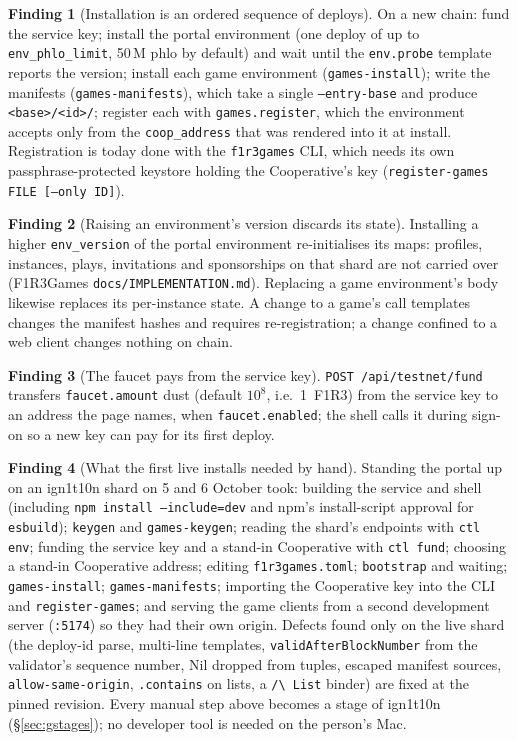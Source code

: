 \documentclass[11pt]{article}
\theoremstyle{definition}
\newtheorem{finding}{Finding}
\theoremstyle{remark}
\newcommand{\code}[1]{\texttt{#1}}
\newcommand{\Hr}{ign1t10n}
\newcommand{\Gm}{F1R3Games}
\begin{document}
\begin{finding}[Installation is an ordered sequence of deploys]\label{f:order}
On a new chain: fund the service key; install the portal environment (one deploy
of up to \code{env\_phlo\_limit}, 50\,M phlo by default) and wait until the
\code{env.probe} template reports the version; install each game environment
(\code{games-install}); write the manifests (\code{games-manifests}), which take a
single \code{--entry-base} and produce \code{<base>/<id>/}; register each with
\code{games.register}, which the environment accepts only from the
\code{coop\_address} that was rendered into it at install. Registration is today done
with the \code{f1r3games} CLI, which needs its own passphrase-protected keystore
holding the Cooperative's key (\code{register-games FILE [--only ID]}).
\end{finding}

\begin{finding}[Raising an environment's version discards its state]\label{f:upgrade}
Installing a higher \code{env\_version} of the portal environment re-initialises its
maps: profiles, instances, plays, invitations and sponsorships on that shard are not
carried over (\Gm{} \code{docs/IMPLEMENTATION.md}). Replacing a game environment's
body likewise replaces its per-instance state. A change to a game's call templates
changes the manifest hashes and requires re-registration; a change confined to a
web client changes nothing on chain.
\end{finding}

\begin{finding}[The faucet pays from the service key]\label{f:faucet}
\code{POST /api/testnet/fund} transfers \code{faucet.amount} dust (default
$10^8$, i.e.\ 1~F1R3) from the service key to an address the page names, when
\code{faucet.enabled}; the shell calls it during sign-on so a new key can pay for its
first deploy.
\end{finding}

\begin{finding}[What the first live installs needed by hand]\label{f:manual}
Standing the portal up on an \Hr{} shard on 5 and 6 October took: building the
service and shell (including \code{npm install --include=dev} and npm's install-script
approval for \code{esbuild}); \code{keygen} and \code{games-keygen}; reading the shard's
endpoints with \code{ctl env}; funding the service key and a stand-in Cooperative with
\code{ctl fund}; choosing a stand-in Cooperative address; editing
\code{f1r3games.toml}; \code{bootstrap} and waiting; \code{games-install};
\code{games-manifests}; importing the Cooperative key into the CLI and
\code{register-games}; and serving the game clients from a second development server
(\code{:5174}) so they had their own origin. Defects found only on the live shard
(the deploy-id parse, multi-line templates, \code{validAfterBlockNumber} from the
validator's sequence number, Nil dropped from tuples, escaped manifest sources,
\code{allow-same-origin}, \code{.contains} on lists, a \code{/\textbackslash\ List}
binder) are fixed at the pinned revision. Every manual step above becomes a stage of
\Hr{} (\S\ref{sec:gstages}); no developer tool is needed on the person's Mac.
\end{finding}
\end{document}
